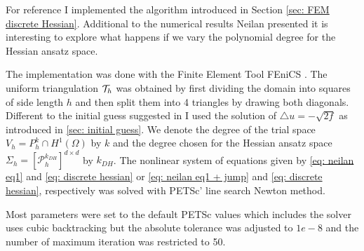 For reference I implemented the algorithm introduced in Section \ref{sec: FEM discrete Hessian}.
Additional to the numerical results Neilan presented it is interesting to explore what happens if we vary the polynomial degree for the Hessian ansatz space. 

The implementation was done with the Finite Element Tool FEniCS \cite{FEniCS}. The uniform triangulation $\mathcal{T}_h$ was obtained by first dividing the domain into squares of side length $h$ and then split them into 4 triangles by drawing both diagonals. \\
Different to the initial guess suggested in \cite{Neilan2014} I used the solution of $\triangle u = -\sqrt{2f}$ as introduced in \ref{sec: initial guess}. 
We denote the degree of the trial space $V_h=P_h^k \cap H^1(\Omega)$ by $k$ and the degree chosen for the Hessian ansatz space $\Sigma_h = [\mathcal{P}_h^{k_{DH}}]^{d \times d}$ by $k_{DH}$. The nonlinear system of equations given by \eqref{eq: neilan eq1} and \eqref{eq: discrete hessian} or \eqref{eq: neilan eq1 + jump} and \eqref{eq: discrete hessian}, respectively was solved with PETSc' line search Newton method. 

Most parameters were set to the default PETSc values which includes the solver uses cubic backtracking but the absolute tolerance was adjusted to $1e-8$ and the number of maximum iteration was restricted to 50. 

